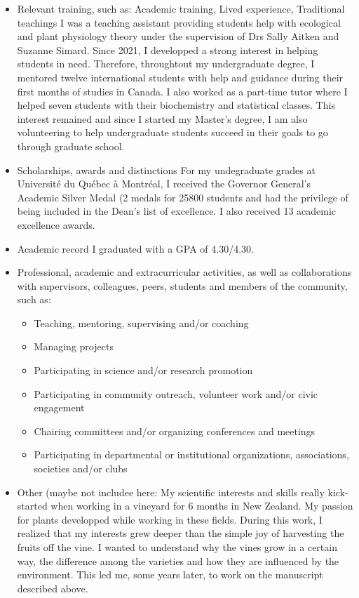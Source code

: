 \documentclass{article}
\begin{document}
\begin{itemize}
    \item Relevant training, such as: Academic training, Lived experience, Traditional teachings
I was a teaching assistant providing students help with ecological and plant physiology theory under the supervision of Drs Sally Aitken and Suzanne Simard. Since 2021, I developped a strong interest in helping students in need. Therefore, throughtout my undergraduate degree, I mentored twelve international students with help and guidance during their first months of studies in Canada. I also worked as a part-time tutor where I helped seven students with their biochemistry and statistical classes. This interest remained and since I started my Master's degree, I am also volunteering to help undergraduate students succeed in their goals to go through graduate school.
    \item Scholarships, awards and distinctions
For my undegraduate grades at Université du Québec à Montréal, I received the Governor General's Academic Silver Medal (2 medals for 25800 students and had the privilege of being included in the Dean's list of excellence. I also received 13 academic excellence awards.
    \item Academic record
I graduated with a GPA of 4.30/4.30.
    \item Professional, academic and extracurricular activities, as well as collaborations with supervisors, colleagues, peers, students and members of the community, such as:
    \begin{itemize}
        \item Teaching, mentoring, supervising and/or coaching
        \item Managing projects
        \item Participating in science and/or research promotion
        \item Participating in community outreach, volunteer work and/or civic engagement
        \item Chairing committees and/or organizing conferences and meetings
        \item Participating in departmental or institutional organizations, associations, societies and/or clubs
    \end{itemize}
    \item Other (maybe not includee here:
    My scientific interests and skills really kick-started when working in a vineyard for 6 months in New Zealand. My passion for plants developped while working in these fields. During this work, I realized that my interests grew deeper than the simple joy of harvesting the fruits off the vine. I wanted to understand why the vines grow in a certain way, the difference among the varieties and how they are influenced by the environment. This led me, some years later, to work on the manuscript described above. 

\end{itemize}


%
\end{document}
